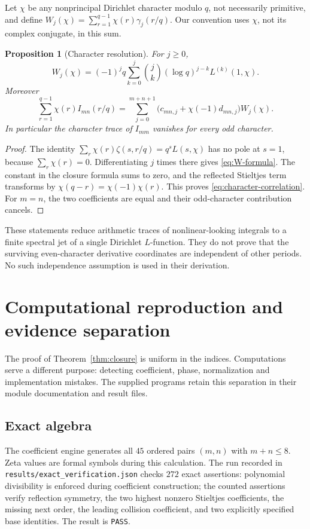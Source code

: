 \documentclass[11pt]{article}
\numberwithin{equation}{section}
\newtheorem{proposition}[theorem]{Proposition}
\theoremstyle{definition}
\theoremstyle{remark}
\newcommand{\file}[1]{\nolinkurl{#1}}
\begin{document}
Let $\chi$ be any nonprincipal Dirichlet character modulo $q$, not
necessarily primitive, and define
$W_j(\chi)=\sum_{r=1}^{q-1}\chi(r)\gamma_j(r/q)$.
Our convention uses $\chi$, not its complex conjugate, in this sum.

\begin{proposition}[Character resolution]
\label{prop:character}
For $j\ge0$,
\begin{equation}
 W_j(\chi)=(-1)^jq\sum_{k=0}^j\binom{j}{k}
                (\log q)^{j-k}L^{(k)}(1,\chi).
 \label{eq:W-formula}
\end{equation}
Moreover
\begin{equation}
 \sum_{r=1}^{q-1}\chi(r)I_{mn}(r/q)
 =\sum_{j=0}^{m+n+1}
           \bigl(c_{mn,j}+\chi(-1)d_{mn,j}\bigr)W_j(\chi).
 \label{eq:character-correlation}
\end{equation}
In particular the character trace of $I_{mm}$ vanishes for every odd
character.
\end{proposition}
\begin{proof}
The identity
$\sum_r\chi(r)\zeta(s,r/q)=q^sL(s,\chi)$ has no pole at $s=1$,
because $\sum_r\chi(r)=0$. Differentiating $j$ times there gives
\eqref{eq:W-formula}. The constant in the closure formula sums to zero,
and the reflected Stieltjes term transforms by
$\chi(q-r)=\chi(-1)\chi(r)$. This proves
\eqref{eq:character-correlation}. For $m=n$, the two coefficients are
equal and their odd-character contribution cancels.
\end{proof}

These statements reduce arithmetic traces of nonlinear-looking
integrals to a finite spectral jet of a single Dirichlet $L$-function.
They do not prove that the surviving even-character derivative
coordinates are independent of other periods. No such independence
assumption is used in their derivation.

\section{Computational reproduction and evidence separation}
\label{sec:verification}

The proof of Theorem~\ref{thm:closure} is uniform in the indices.
Computations serve a different purpose: detecting coefficient, phase,
normalization and implementation mistakes. The supplied programs retain
this separation in their module documentation and result files.

\subsection{Exact algebra}
The coefficient engine generates all $45$ ordered pairs $(m,n)$ with
$m+n\le8$. Zeta values are formal symbols during this calculation.
The run recorded in \file{results/exact_verification.json} checks
$272$ exact assertions: polynomial divisibility is enforced during
coefficient construction; the counted assertions verify reflection
symmetry, the two highest nonzero Stieltjes coefficients, the missing
next order, the leading collision coefficient, and two explicitly
specified base identities. The result is \texttt{PASS}.
\end{document}
